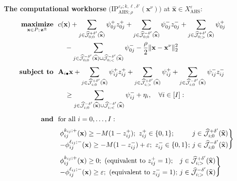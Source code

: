 \documentclass[aspectratio=169,xcolor=dvipsnames]{beamer}
\begin{document}
\begin{frame}
  \scriptsize
  \setlength{\abovedisplayskip}{2pt}
  \setlength{\belowdisplayskip}{2pt}

  \textbf{The computational workhorse}
  $\bigl(\mathrm{IP}^{\varepsilon_\nu;k,\ell,\delta'}_{\mathrm{AHS};\rho}
  (\mathbf{x}^\nu)\bigr)$ at $\widehat{\mathbf{x}}\in X^\varepsilon_{\mathrm{AHS}}$:
  \[
    \begin{aligned}
      \operatorname*{\textbf{maximize}}_{\mathbf{x}\in P;\,\mathbf{z}^\pm}\ \
      &c(\mathbf{x})
        +\sum_{j\in\widehat{\mathcal{J}}^{+\delta'}_{0;0}(\widehat{\mathbf{x}})}
          \psi^+_{0j}z^+_{0j}
        +\sum_{j\in\widehat{\mathcal{J}}^{-\delta'}_{0;0}(\widehat{\mathbf{x}})}
          \psi^-_{0j}z^-_{0j}
        +\sum_{j\in\widehat{\mathcal{J}}^{+\delta'}_{0;>}(\widehat{\mathbf{x}})}
          \psi^+_{0j}\\
      &\quad-\sum_{j\in\widehat{\mathcal{J}}^{-\delta'}_{0;0}(\widehat{\mathbf{x}})
          \cup\widehat{\mathcal{J}}^{-\delta'}_{0;<}(\widehat{\mathbf{x}})}
          \psi^-_{0j}
        -\frac{\rho}{2}\|\mathbf{x}-\mathbf{x}^\nu\|_2^2\\[2pt]
      \operatorname*{\textbf{subject to}}\ \
      &\mathbf{A}_{i\bullet}\mathbf{x}
        +\sum_{j\in\widehat{\mathcal{J}}^{+\delta'}_{i;0}(\widehat{\mathbf{x}})}
          \psi^+_{ij}z^+_{ij}
        +\sum_{j\in\widehat{\mathcal{J}}^{+\delta'}_{i;>}(\widehat{\mathbf{x}})}
          \psi^+_{ij}
        +\sum_{j\in\widehat{\mathcal{J}}^{-\delta'}_{i;0}(\widehat{\mathbf{x}})}
          \psi^-_{ij}z^-_{ij}\\
      &\quad\geq
        \sum_{j\in\widehat{\mathcal{J}}^{-\delta'}_{i;0}(\widehat{\mathbf{x}})
          \cup\widehat{\mathcal{J}}^{-\delta'}_{i;<}(\widehat{\mathbf{x}})}
          \psi^-_{ij}+\eta_i,\quad\forall i\in[I]:\\[4pt]
      \textbf{and}\ \
      &\text{for all }i=0,\ldots,I:\\[3pt]
      &\left.\begin{array}{@{}l@{\ }l@{}}
        \phi^{k_{ij};+}_{ij}(\mathbf{x})\geq -M(1-z^+_{ij});\ z^+_{ij}\in\{0,1\};
          & j\in\widehat{\mathcal{J}}^{+\delta'}_{i;0}(\widehat{\mathbf{x}})\\[3pt]
        -\phi^{\ell_{ij};-}_{ij}(\mathbf{x})\geq -M(1-z^-_{ij})+\varepsilon;\
          z^-_{ij}\in\{0,1\};
          & j\in\widehat{\mathcal{J}}^{-\delta'}_{i;0}(\widehat{\mathbf{x}})
      \end{array}\right\}\\[5pt]
      &\left.\begin{array}{@{}l@{\ }l@{}}
        \phi^{k_{ij};+}_{ij}(\mathbf{x})\geq 0;\ (\text{equivalent to }
          z^+_{ij}=1); & j\in\widehat{\mathcal{J}}^{+\delta'}_{i;>}(\widehat{\mathbf{x}})\\[3pt]
        -\phi^{\ell_{ij};-}_{ij}(\mathbf{x})\geq\varepsilon;\ (\text{equivalent to }
          z^-_{ij}=1); & j\in\widehat{\mathcal{J}}^{-\delta'}_{i;>}(\widehat{\mathbf{x}})
      \end{array}\right\}
    \end{aligned}
  \]
\end{frame}
\end{document}
